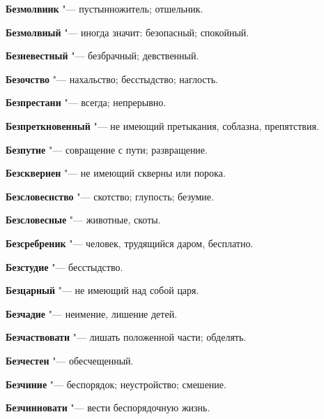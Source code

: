 \begin{mymulticols}{2}
\noindent\textbf{Безмолвник} "--- пустынножитель; отшельник. 




\noindent\textbf{Безмолвный} "--- иногда значит: безопасный; спокойный. 




\noindent\textbf{Безневестный} "--- безбрачный; девственный. 




\noindent\textbf{Безочство} "--- нахальство; бесстыдство; наглость. 




\noindent\textbf{Безпрестани} "--- всегда; непрерывно. 




\noindent\textbf{Безпреткновенный} "--- не имеющий претыкания, соблазна, препятствия. 




\noindent\textbf{Безпутие} "--- совращение с пути; развращение. 




\noindent\textbf{Безсквернен} "--- не имеющий скверны или порока. 




\noindent\textbf{Безсловеснство} "--- скотство; глупость; безумие. 




\noindent\textbf{Безсловесные} "--- животные, скоты. 




\noindent\textbf{Безсребреник} "--- человек, трудящийся даром, бесплатно. 




\noindent\textbf{Безстудие} "--- бесстыдство. 




\noindent\textbf{Безцарный} "--- не имеющий над собой царя. 




\noindent\textbf{Безчадие} "--- неимение, лишение детей. 




\noindent\textbf{Безчаствовати} "--- лишать положенной части; обделять. 




\noindent\textbf{Безчестен} "--- обесчещенный. 




\noindent\textbf{Безчиние} "--- беспорядок; неустройство; смешение. 




\noindent\textbf{Безчинновати} "--- вести беспорядочную жизнь. 





\end{mymulticols}
